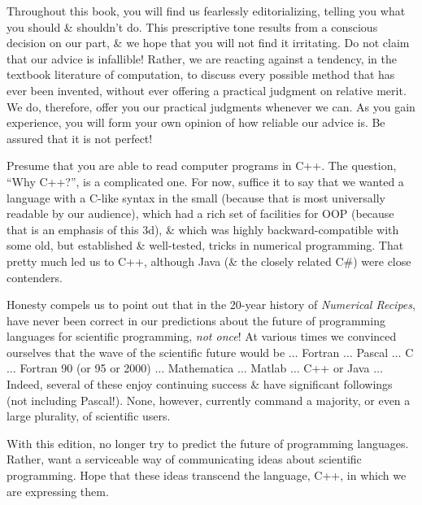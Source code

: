 \documentclass{article}
\begin{document}
\begin{enumerate}
\begin{itemize}
\begin{itemize}
			Throughout this book, you will find us fearlessly editorializing, telling you what you should \& shouldn't do. This prescriptive tone results from a conscious decision on our part, \& we hope that you will not find it irritating. Do not claim that our advice is infallible! Rather, we are reacting against a tendency, in the textbook literature of computation, to discuss every possible method that has ever been invented, without ever offering a practical judgment on relative merit. We do, therefore, offer you our practical judgments whenever we can. As you gain experience, you will form your own opinion of how reliable our advice is. Be assured that it is not perfect!
			
			Presume that you are able to read computer programs in C++. The question, ``Why C++?'', is a complicated one. For now, suffice it to say that we wanted a language with a C-like syntax in the small (because that is most universally readable by our audience), which had a rich set of facilities for OOP (because that is an emphasis of this 3d), \& which was highly backward-compatible with some old, but established \& well-tested, tricks in numerical programming. That pretty much led us to C++, although Java (\& the closely related C\#) were close contenders.
			
			Honesty compels us to point out that in the 20-year history of {\it Numerical Recipes}, have never been correct in our predictions about the future of programming languages for scientific programming, {\it not once}! At various times we convinced ourselves that the wave of the scientific future would be $\ldots$ Fortran $\ldots$ Pascal $\ldots$ C $\ldots$ Fortran 90 (or 95 or 2000) $\ldots$ Mathematica $\ldots$ Matlab $\ldots$ C++ or Java $\ldots$ Indeed, several of these enjoy continuing success \& have significant followings (not including Pascal!). None, however, currently command a majority, or even a large plurality, of scientific users.
			
			With this edition, no longer try to predict the future of programming languages. Rather, want a serviceable way of communicating ideas about scientific programming. Hope that these ideas transcend the language, C++, in which we are expressing them.
			

\end{itemize}
\end{itemize}
\end{enumerate}
\end{document}
